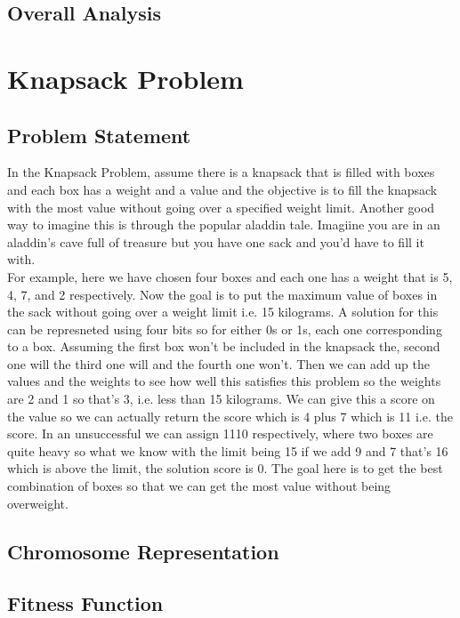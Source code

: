 \documentclass[11pt, letterpaper]{article}
\begin{document}
\subsection {Overall Analysis}

\newpage

\section{Knapsack Problem}
\subsection{Problem Statement}
In the Knapsack Problem, assume there is a knapsack that is filled with boxes and each box has a 
weight and a value and the objective is to fill the knapsack with the most value without going over 
a specified weight limit. Another good way to imagine this is through the popular aladdin tale. 
Imagiine you are in an aladdin's cave full of treasure but you have one sack and you'd have to fill 
it with.\\
For example, here we have chosen four boxes and each one has a weight that is 5, 4, 7, and 2 
respectively. Now the goal is to put the maximum value of boxes in the sack without going over a 
weight limit i.e. 15 kilograms. A solution for this can be represneted using four bits so for either 0s 
or 1s, each one corresponding to a box. Assuming the first box
won't be included in the knapsack 
the, second one will the third one will and the fourth one won't. Then we can add up the values 
and the weights to see how well this satisfies this problem so the weights are 2 and 1 so that's 3, i.e. 
less than 15 kilograms. We can give this a score on the
value so we can actually return the score 
which is 4 plus 7 which is 11 i.e. the score. In an unsuccessful we can assign 1110 respectively, 
where two boxes are quite heavy so what we know with the limit being 15 if we add 9 and 7 that's 
16 which is above the limit, the solution score is 0. The goal here is to get the best combination of 
boxes so that we can get the most value without being overweight.

\subsection{Chromosome Representation}

\subsection{Fitness Function}
\end{document}
